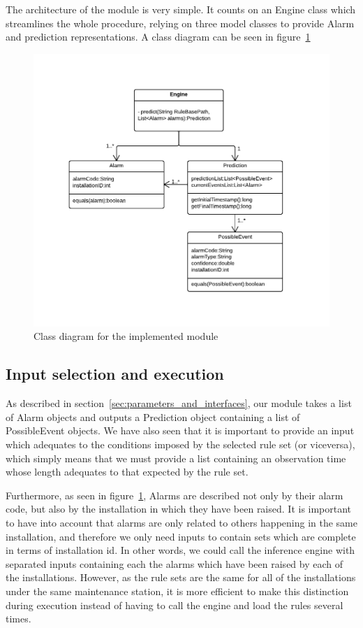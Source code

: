 The architecture of the module is very simple. It counts on an Engine class which streamlines the whole procedure, relying on three model classes to provide Alarm and prediction representations. A class diagram can be seen in figure~\ref{fig:prototypeArchitecture}

\begin{figure}[hbtp]
\includegraphics[width=\textwidth]{img/prototypeArchitecture.pdf}
\caption{Class diagram for the implemented module} \label{fig:prototypeArchitecture}
\end{figure}

\subsection{Input selection and execution}
As described in section~\ref{sec:parameters_and_interfaces}, our module takes a list of Alarm objects and outputs a Prediction object containing a list of PossibleEvent objects. We have also seen that it is important to provide an input which adequates to the conditions imposed by the selected rule set (or viceversa), which simply means that we must provide a list containing an observation time whose length adequates to that expected by the rule set.

Furthermore, as seen in figure~\ref{fig:prototypeArchitecture}, Alarms are described not only by their alarm code, but also by the installation in which they have been raised. It is important to have into account that alarms are only related to others happening in the same installation, and therefore we only need inputs to contain sets which are complete in terms of installation id. In other words, we could call the inference engine with separated inputs containing each the alarms which have been raised by each of the installations. However, as the rule sets are the same for all of the installations under the same maintenance station, it is more efficient to make this distinction during execution instead of having to call the engine and load the rules several times.

